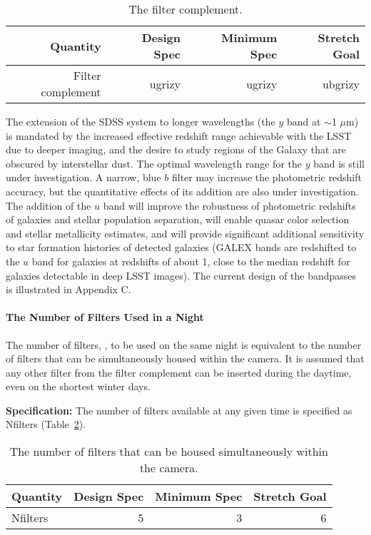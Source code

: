 \begin{table}[h!]
\begin{tabular}{|r|r|r|r|}
\hline
Quantity               & Design Spec & Minimum Spec & Stretch Goal      \\
\hline
 Filter complement     &   ugrizy      &   ugrizy       &   ubgrizy \\
\hline
\end{tabular}
\caption{The filter complement.}
\label{Tfilters}
\end{table}

\vskip -0.1in
The extension of the SDSS system to longer wavelengths (the $y$ band at
$\sim$1 $\mu$m) is
mandated by the increased effective redshift range achievable with the LSST
due to deeper imaging, and the desire to study regions of the Galaxy that
are obscured by interstellar dust.
The optimal wavelength range for the $y$ band is
still under investigation. A narrow, blue $b$ filter may increase the
photometric redshift accuracy, but the quantitative effects of its addition
are also under investigation. The addition of the $u$ band will improve the
robustness of photometric redshifts of galaxies and stellar population
separation, will enable quasar color selection and stellar metallicity
estimates, and will provide significant additional sensitivity to star
formation histories of detected galaxies (\eg GALEX bands are redshifted
to the $u$ band for galaxies at redshifts of about 1, close to the median
redshift for galaxies detectable in deep LSST images). The current design of
the bandpasses is illustrated in Appendix C.



\paragraph{The Number of Filters Used in a Night\\}

The number of filters,
,
to be used on the same night is
equivalent to the number of filters that can be simultaneously housed
within the camera. It is assumed that any other filter from the filter
complement can be inserted during the daytime, even on the shortest
winter days.

\textbf{Specification:} The number of filters available at any given time is
specified as Nfilters (Table~\ref{Tfilterchanges}).

\begin{table}[bh!]
\begin{tabular}{|l|r|r|r|}
\hline
Quantity        & Design Spec & Minimum Spec & Stretch Goal      \\
\hline
 Nfilters       &      5      &      3       &       6           \\
\hline
\end{tabular}
\caption{The number of filters that can be housed simultaneously within the
camera.}
\label{Tfilterchanges}
\end{table}


